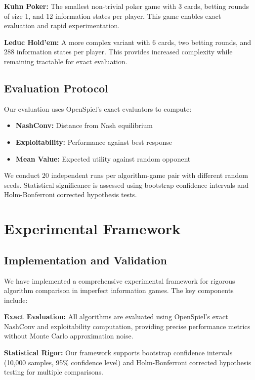 \documentclass[10pt,twocolumn,conference]{IEEEtran}
\begin{document}
\textbf{Kuhn Poker:} The smallest non-trivial poker game with 3 cards, betting rounds of size 1, and 12 information states per player. This game enables exact evaluation and rapid experimentation.

\textbf{Leduc Hold'em:} A more complex variant with 6 cards, two betting rounds, and 288 information states per player. This provides increased complexity while remaining tractable for exact evaluation.

\subsection{Evaluation Protocol}
Our evaluation uses OpenSpiel's exact evaluators to compute:
\begin{itemize}
    \item \textbf{NashConv:} Distance from Nash equilibrium
    \item \textbf{Exploitability:} Performance against best response
    \item \textbf{Mean Value:} Expected utility against random opponent
\end{itemize}

We conduct 20 independent runs per algorithm-game pair with different random seeds. Statistical significance is assessed using bootstrap confidence intervals and Holm-Bonferroni corrected hypothesis tests.

\section{Experimental Framework}
\label{sec:experimental_framework}

\subsection{Implementation and Validation}
We have implemented a comprehensive experimental framework for rigorous algorithm comparison in imperfect information games. The key components include:

\textbf{Exact Evaluation:} All algorithms are evaluated using OpenSpiel's exact NashConv and exploitability computation, providing precise performance metrics without Monte Carlo approximation noise.

\textbf{Statistical Rigor:} Our framework supports bootstrap confidence intervals (10,000 samples, 95\% confidence level) and Holm-Bonferroni corrected hypothesis testing for multiple comparisons.
\end{document}
